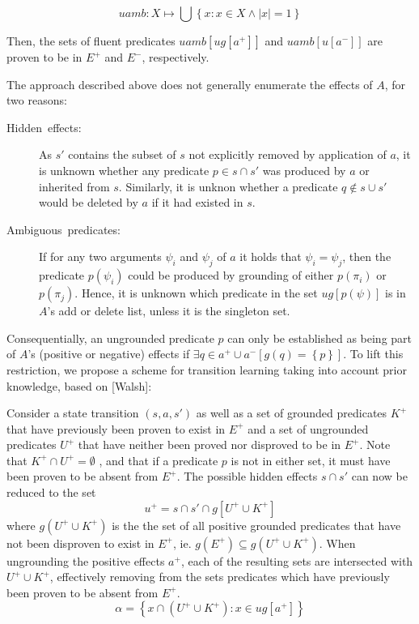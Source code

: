 \documentclass[../Master.tex]{subfiles}
\begin{document}
\[
uamb:X\mapsto\bigcup\left\{ x:x\in X\land\left|x\right|=1\right\}
\]


Then, the sets of fluent predicates $uamb\left[ug\left[a^{+}\right]\right]$
and $uamb\left[u\left[a^{-}\right]\right]$ are proven to be in $E^{+}$
and $E^{-}$, respectively.

The approach described above does not generally enumerate the effects
of $A$, for two reasons:
\begin{description}
\item [{Hidden\ effects:}] As $s'$ contains the subset of $s$ not explicitly
removed by application of $a$, it is unknown whether any predicate
$p\in s\cap s'$ was produced by $a$ or inherited from $s$. Similarly,
it is unknon whether a predicate $q\notin s\cup s'$ would be deleted
by $a$ if it had existed in $s$.
\item [{Ambiguous\ predicates:}] If for any two arguments $\psi_{i}$
and $\psi_{j}$ of $a$ it holds that $\psi_{i}=\psi_{j}$, then the
predicate $p\left(\psi_{i}\right)$ could be produced by grounding
of either $p\left(\pi_{i}\right)$ or $p\left(\pi_{j}\right)$. Hence,
it is unknown which predicate in the set $ug\left[p\left(\psi\right)\right]$
is in $A$'s add or delete list, unless it is the singleton set.
\end{description}
Consequentially, an ungrounded predicate $p$ can only be established
as being part of $A$'s (positive or negative) effects if $\exists q\in a^{+}\cup a^{-}\left[g\left(q\right)=\left\{ p\right\} \right]$.
To lift this restriction, we propose a scheme for transition learning
taking into account prior knowledge, based on {[}Walsh{]}:

Consider a state transition $\left(s,a,s'\right)$ as well as a set
of grounded predicates $K^{+}$ that have previously been proven to
exist in $E^{+}$ and a set of ungrounded predicates $U^{+}$ that
have neither been proved nor disproved to be in $E^{+}$. Note that
$K^{+}\cap U^{+}=\emptyset$ , and that if a predicate $p$ is not
in either set, it must have been proven to be absent from $E^{+}$.
The possible hidden effects $s\cap s'$ can now be reduced to the
set
\[
u^{+}=s\cap s'\cap g\left[U^{+}\cup K^{+}\right]
\]
where $g\left(U^{+}\cup K^{+}\right)$ is the the set of all positive
grounded predicates that have not been disproven to exist in $E^{+}$,
ie. $g\left(E^{+}\right)\subseteq g\left(U^{+}\cup K^{+}\right)$.
When ungrounding the positive effects $a^{+}$, each of the resulting
sets are intersected with $U^{+}\cup K^{+}$, effectively removing
from the sets predicates which have previously been proven to be absent
from $E^{+}$.
\[
\alpha=\left\{ x\cap\left(U^{+}\cup K^{+}\right):x\in ug\left[a^{+}\right]\right\}
\]
\end{document}

